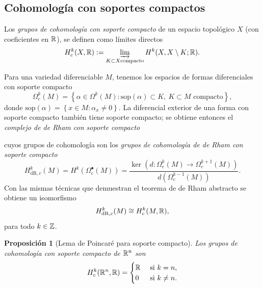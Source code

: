 \documentclass[11pt,a4paper]{amsbook}
\newtheorem{prop}[subsection]{Proposición}
\theoremstyle{remark} \newtheorem{rmk}[subsection]{Observación}
\theoremstyle{definition} \newtheorem{defn}[subsection]{Definición}
\theoremstyle{definition} \newtheorem{ex}[subsection]{Ejemplo}
\theoremstyle{definition} \newtheorem{ej}[subsection]{Ejercicio}
\begin{document}
\subsection{Cohomología con soportes compactos} Los \emph{grupos de cohomología con soporte compacto} de un espacio topológico $X$ (con coeficientes en $\mathbb R$), se definen como límites directos
\begin{equation*}
H_c^k(X,\mathbb R) := \varinjlim_{K\subset X \text{compacto}} H^k(X,X\setminus K; \mathbb R).
\end{equation*}

Para una variedad diferenciable $M$, tenemos los espacios de formas diferenciales con soporte compacto
\begin{equation*}
\Omega^k_c(M) = \left\{ \alpha \in \Omega^k(M): \mathrm{sop}(\alpha) \subset K,\ K\subset M  \text{ compacto} \right\},
\end{equation*}
donde $\mathrm{sop}(\alpha)=\left\{ x\in M: \alpha_x \neq 0 \right\}$. La diferencial exterior de una forma con soporte compacto también tiene soporte compacto; se obtiene entonces el \emph{complejo de de Rham con soporte compacto}
  \begin{center}
  \end{center}
  cuyos grupos de cohomología son los \emph{grupos de cohomología de de Rham con soporte compacto}
  \begin{equation*}
H^k_{\mathrm{dR},c}(M) = H^k(\Omega_c^\bullet(M)) = \frac{\ker(d:\Omega_c^k(M)\rightarrow \Omega_c^{k+1}(M))}{d(\Omega_c^{k-1}(M))}.
  \end{equation*}
  Con las mismas técnicas que demuestran el teorema de de Rham abstracto se obtiene un isomorfismo
  \begin{equation*}
H^k_{\mathrm{dR},c}(M) \cong H_c^k(M,\mathbb R),
  \end{equation*}
  para todo $k\in \mathbb Z$.

\begin{prop}[Lema de Poincaré para soporte compacto]
  Los grupos de cohomología con soporte compacto de $\mathbb R^n$ son
  \begin{equation*}
    H^k_{c}(\mathbb R^n,\mathbb R) =
    \begin{cases}
\mathbb R & \text{ si } k= n,\\
0 & \text{ si } k\neq n.
\end{cases}
  \end{equation*}
\end{prop}
\end{document}
